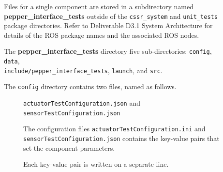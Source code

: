 \documentclass{CSSRforAfrica}
\newcommand{\checkboxChecked}{\fbox{\ding{51}}} %
\begin{document}
\begin{description}

\item[\checkboxChecked] Files for a single component are stored in a subdirectory named \textbf{pepper\_interface\_tests} outside of the \verb+cssr_system+ and \verb+unit_tests+ package directories. Refer to Deliverable D3.1 System Architecture for details of the ROS package names and the associated ROS nodes.

\item[\checkboxChecked] The \textbf{pepper\_interface\_tests} directory five sub-directories: {\small \verb+config+},   {\small \verb+data+},  \\ {\small \verb+include/pepper_interface_tests+}, {\small \verb+launch+}, and {\small \verb+src+}.

\item[\checkboxChecked] The  {\small \verb+config+} directory contains two files, named as follows.
\begin{description}
\item[\checkboxChecked] {\small \verb+actuatorTestConfiguration.json+}  and {\small \verb+sensorTestConfiguration.json+}
\item[\checkboxChecked] The configuration files {\small \verb+actuatorTestConfiguration.ini+} and \\ {\small \verb+sensorTestConfiguration.json+} contains the key-value pairs that set the component parameters.  
\item[\checkboxChecked] Each key-value pair is written on a separate line.
\end{description} 


\end{description}
\end{document}
